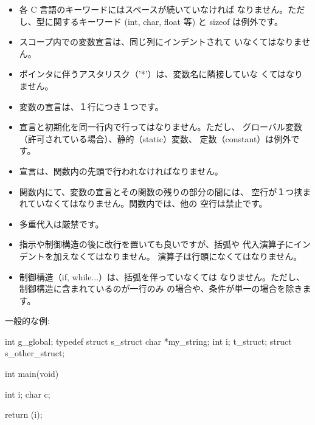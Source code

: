 \documentclass{42-ja}
\begin{document}
\begin{itemize}
                \item 各 C 言語のキーワードにはスペースが続いていなければ
					なりません。ただし、型に関するキーワード (int, char,
					float 等) と sizeof は例外です。

                \item スコープ内での変数宣言は、同じ列にインデントされて
					いなくてはなりません。

                \item ポインタに伴うアスタリスク（'*'）は、変数名に隣接していな
					くてはなりません。

                \item 変数の宣言は、１行につき１つです。

                \item 宣言と初期化を同一行内で行ってはなりません。ただし、
					グローバル変数（許可されている場合）、静的（static）変数、
					定数（constant）は例外です。

                \item 宣言は、関数内の先頭で行われなければなりません。

                \item 関数内にて、変数の宣言とその関数の残りの部分の間には、
					空行が１つ挟まれていなくてはなりません。関数内では、他の
					空行は禁止です。

                \item 多重代入は厳禁です。

                \item 指示や制御構造の後に改行を置いても良いですが、括弧や
					代入演算子にインデントを加えなくてはなりません。
					演算子は行頭になくてはなりません。

                \item 制御構造（if, while...）は、括弧を伴っていなくては
					なりません。ただし、制御構造に含まれているのが一行のみ
					の場合や、条件が単一の場合を除きます。

            \end{itemize}

            一般的な例:
            \begin{42ccode}
int             g_global;
typedef struct  s_struct
{
    char    *my_string;
    int     i;
}               t_struct;
struct          s_other_struct;

int     main(void)
{
    int     i;
    char    c;

    return (i);
}
            \end{42ccode}
            \newpage
\end{document}
